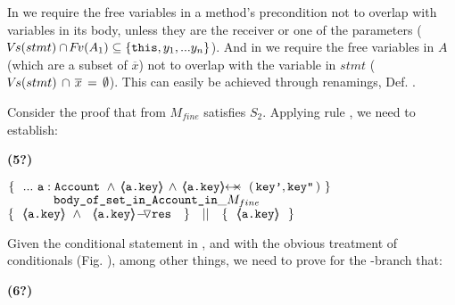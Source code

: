  
 In  {} we  require   the free variables  in a method's precondition  not to overlap with variables in its body, unless they are the receiver or one of the parameters (${{{\hspace{-1pt}V\hspace{-1pt}}s(stmt) \cap {\hspace{-1pt}F\hspace{-1pt}}v(A_1) \subseteq   \{ \mbox{\normalfont{\texttt{this}}}, y_1, ... y_n \} }}$).  And in {} we require   the free variables in $A$ (which are a subset of  $\overline x$) not to overlap with the variable  in $stmt$ ($ {{ {\hspace{-1pt}V\hspace{-1pt}}s(stmt)\,  \cap\, \overline x\, =\, \emptyset}}$).
This can easily be achieved through renamings, \cf Def. .

\newcommand{\sdsp}{\strut \ \ \ \ \ }

\begin{example} Consider the proof that  from $M_{fine}$ satisfies $S_2$. 
Applying rule {}, we need to establish:\\
\label{e:public}
{\small{ \vspace{.05cm}
  \begin{minipage}{.05\textwidth}
  \textbf{(5?)}\ \ 
\end{minipage}
\hfill
\begin{minipage}{.95\textwidth}
\begin{flushleft}
$\{ \  \   ...\  \prg{a}:\prg{Account}\ \wedge\,  {\inside{\prg{a.key}}} \, \wedge \, \protectedFrom {\prg{a.key}} { (\, \prg{key'},\prg{key''}\, )} \  \} \ $\\
$\ \ \ \ \ \ \ \ \ \ \  \prg{body\_of\_set\_in\_Account\_in}\_ M_{fine}\   $\\
$  \{\  \    {\inside{\prg{a.key}}}\ \wedge\ {\PushASLong {\prg{res}\ } {\ \inside{\prg{a.key}}}} \ \   \} \ \ \  || \ \ \ 
	\{\ \    {\inside{\prg{a.key}}}\ \  \}  $ 
\end{flushleft}
\end{minipage}
}}
\vspace{.03cm}
\noindent
Given the conditional statement in , and with the obvious treatment of conditionals (\cf Fig. ), among other things, we  need to prove for the -branch that:\\
\vspace{.01cm}
{\small{  \begin{minipage}{.05\textwidth}
  \textbf{(6?)}\ \ 
\end{minipage}
\hfill
\begin{minipage}{.95\textwidth}
\begin{flushleft}

\end{flushleft}
\end{minipage}}}
\end{example}
